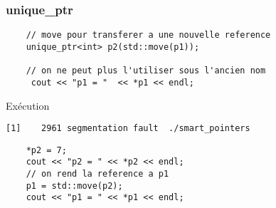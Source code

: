 \begin{frame}[fragile]
\frametitle{unique\_ptr}
\begin{lstlisting}
    // move pour transferer a une nouvelle reference 
    unique_ptr<int> p2(std::move(p1)); 

    // on ne peut plus l'utiliser sous l'ancien nom 
     cout << "p1 = "  << *p1 << endl;
\end{lstlisting}
\begin{exampleblock}{Exécution}
{\tiny
\begin{verbatim}
[1]    2961 segmentation fault  ./smart_pointers
\end{verbatim}
}
\end{exampleblock}

\begin{lstlisting}
    *p2 = 7;
    cout << "p2 = " << *p2 << endl;
    // on rend la reference a p1
    p1 = std::move(p2);
    cout << "p1 = " << *p1 << endl;
\end{lstlisting}    
\end{frame}